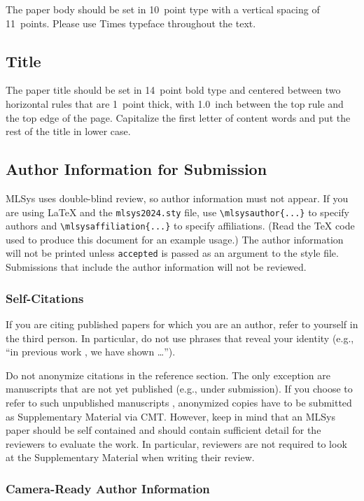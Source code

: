 \documentclass{article}
\begin{document}
The paper body should be set in 10~point type with a vertical spacing
of 11~points. Please use Times typeface throughout the text.

\subsection{Title}

The paper title should be set in 14~point bold type and centered
between two horizontal rules that are 1~point thick, with 1.0~inch
between the top rule and the top edge of the page. Capitalize the
first letter of content words and put the rest of the title in lower
case.

\subsection{Author Information for Submission}
\label{author info}

MLSys uses double-blind review, so author information must not appear. If
you are using \LaTeX\/ and the \texttt{mlsys2024.sty} file, use
\verb+\mlsysauthor{...}+ to specify authors and \verb+\mlsysaffiliation{...}+ to specify affiliations. (Read the TeX code used to produce this document for an example usage.) The author information
will not be printed unless \texttt{accepted} is passed as an argument to the
style file.
Submissions that include the author information will not
be reviewed.

\subsubsection{Self-Citations}

If you are citing published papers for which you are an author, refer
to yourself in the third person. In particular, do not use phrases
that reveal your identity (e.g., ``in previous work \cite{langley00}, we
have shown \ldots'').

Do not anonymize citations in the reference section. The only exception are manuscripts that are
not yet published (e.g., under submission). If you choose to refer to
such unpublished manuscripts \cite{anonymous}, anonymized copies have
to be submitted
as Supplementary Material via CMT\@. However, keep in mind that an MLSys
paper should be self contained and should contain sufficient detail
for the reviewers to evaluate the work. In particular, reviewers are
not required to look at the Supplementary Material when writing their
review.

\subsubsection{Camera-Ready Author Information}
\label{final author}
\end{document}

